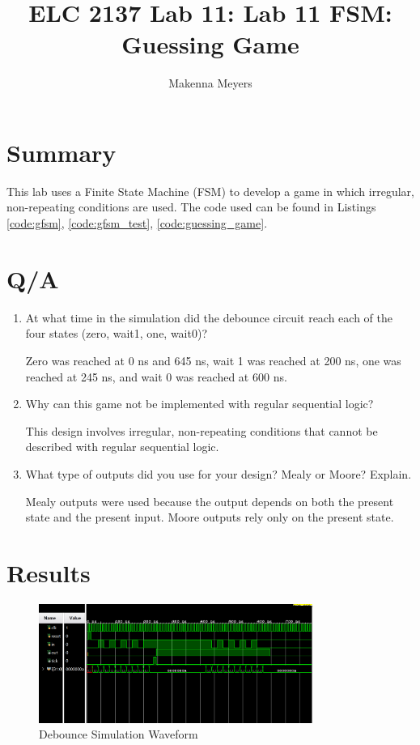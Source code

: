 \documentclass[11pt]{article}
\begin{document}
\title{ELC 2137 Lab 11: Lab 11 FSM: Guessing Game}
\author{Makenna Meyers}

\maketitle


\section*{Summary}
 This lab uses a Finite State Machine (FSM) to develop a game in which irregular, non-repeating conditions are used. The code used can be found in Listings \ref{code:gfsm}, \ref{code:gfsm_test}, \ref{code:guessing_game}. 
 
 \section*{Q/A}
 \begin{enumerate}
 	
 	\item At what time in the simulation did the debounce circuit reach each of the four states (zero, wait1, one, wait0)?
 	
 	Zero was reached at 0 ns and 645 ns, wait 1 was reached at 200 ns, one was reached at 245 ns, and wait 0 was reached at 600 ns.
 	
 	\item Why can this game not be implemented with regular sequential logic?
 	
 	This design involves irregular, non-repeating conditions that cannot be described with regular sequential logic.
 	
 	\item What type of outputs did you use for your design? Mealy or Moore? Explain.
 	
 	Mealy outputs were used because the output depends on both the present state and the present input. Moore outputs rely only on the present state.
 	
 \end{enumerate}


\section*{Results}

\begin{figure}[ht]\centering
	\includegraphics[width=0.8\textwidth,trim=0cm 0cm 0cm 0cm,clip]{debounce_simwave}
	\caption{Debounce Simulation Waveform}
	\label{fig:debounce_simwave}			
\end{figure}
\clearpage
\end{document}
